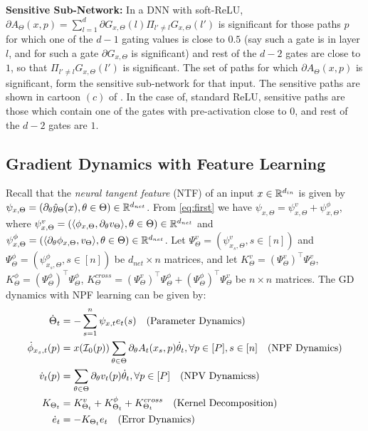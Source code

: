 \textbf{Sensitive Sub-Network:} In a DNN with soft-ReLU, $\partial A_{\Theta}(x,p)=\sum_{l=1}^d \partial G_{x,\Theta}(l)\Pi_{l'\neq l}G_{x,\Theta}(l')$ is significant for those paths $p$ for which one of the $d-1$ gating values is close to $0.5$ (say such a gate is in layer $l$, and for such a gate $\partial G_{x,\Theta}$ is significant) and rest of the $d-2$ gates are close to $1$, so that $\Pi_{l'\neq l}G_{x,\Theta}(l')$ is significant. The set of paths for which $\partial A_{\Theta}(x,p)$ is significant, form the sensitive sub-network for that input. The sensitive paths are shown in cartoon $(c)$ of . In the case of, standard ReLU, sensitive paths are those which contain one of the gates with pre-activation close to $0$, and rest of the $d-2$ gates are $1$.
\subsection{Gradient Dynamics with Feature Learning}
Recall that the \emph{neural tangent feature} (NTF) of an input $x\in\mathbb{R}^{d_{in}}$ is given by $\psi_{x,\Theta}=\left(\partial_{\theta}\hat{y}_{\Theta}(x),\theta\in\Theta\right)\in\mathbb{R}^{d_{net}}$. From \eqref{eq:first} we have $\psi_{x,\Theta}=\psi^v_{x,\Theta}+\psi^{\phi}_{x,\Theta}$, where $\psi^v_{x,\Theta}=\left(\langle \phi_{x,\Theta}, \partial_{\theta} v_{\Theta}\rangle,\theta\in\Theta\right)\in\mathbb{R}^{d_{net}}$ and  $\psi^{\phi}_{x,\Theta}=\left(\langle \partial_{\theta}\phi_{x,\Theta}, v_{\Theta}\rangle,\theta\in\Theta\right)\in\mathbb{R}^{d_{net}}$.  Let $\Psi^v_{\Theta}=\left(\psi^v_{x_s,\Theta},s\in[n]\right)$ and $\Psi^{\phi}_{\Theta}=\left(\psi^{\phi}_{x_s,\Theta},s\in[n]\right)$ be $d_{net}\times n$ matrices, and let $K^{v}_{\Theta}=(\Psi^{v}_{\Theta})^\top \Psi^{v}_{\Theta}$, $K^{\phi}_{\Theta}=(\Psi^{\phi}_{\Theta})^\top \Psi^{\phi}_{\Theta}$, $K^{cross}_{\Theta}=(\Psi^v_{\Theta})^\top \Psi^{\phi}_{\Theta}+(\Psi^{\phi}_{\Theta})^\top\Psi^{v}_{\Theta}$ be $n\times n$ matrices. The GD dynamics with NPF learning can be given by:
\begin{align}\label{eq:graddyna} 
\begin{split}
\dot{\Theta}_t&=-\sum_{s=1}^n \psi_{x,t}e_t(s)\quad(\text{Parameter Dynamics})\\
\dot{\phi}_{x_s,t}(p)&=x(\mathcal{I}_0(p))\sum_{\theta\in\Theta}\partial_{\theta}A_t(x_s,p)\dot{\theta}_t,\forall p\in[P], s\in[n]\quad(\text{NPF Dynamics})\\
\dot{v}_t(p)&=\sum_{\theta\in\Theta}\partial_{\theta}v_t(p)\dot{\theta}_t,\forall p\in[P]\quad(\text{NPV Dynamicss})\\
K_{\Theta_t}&=K^v_{\Theta_t}+K^{\phi}_{\Theta_t}+K^{cross}_{\Theta_t}\quad(\text{Kernel Decomposition})\\
\dot{e}_t&=-K_{\Theta_t}e_t\quad(\text{Error Dynamics})
\end{split}
\end{align}
